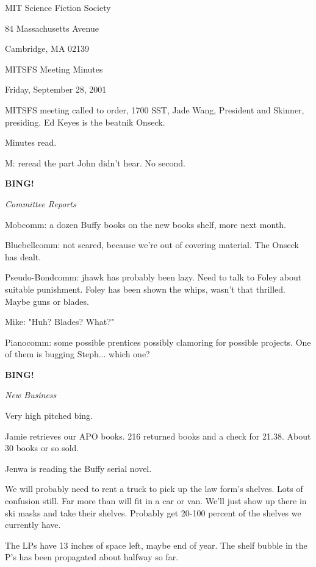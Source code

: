 \documentclass[12pt]{article}
\newcommand{\bing}{{\bf BING!} }
\newcommand{\goto}[1]{\bing \vskip 12pt \centerline{{\em{#1}}}}
\begin{document}
\begin{center}

MIT Science Fiction Society 

84 Massachusetts Avenue

Cambridge, MA 02139

\vspace{12pt}

MITSFS Meeting Minutes 

Friday, September 28, 2001

\end{center}
 
\vspace{18pt}

\setlength{\parskip}{6pt}

\noindent
MITSFS meeting called to order, 1700 SST, Jade Wang, President and
Skinner, presiding.  Ed Keyes is the beatnik Onseck.

Minutes read.

M: reread the part John didn't hear. No second.

\goto{Committee Reports}

Mobcomm: a dozen Buffy books on the new books shelf, more next month.

Bluebellcomm: not scared, because we're out of covering material. The Onseck has dealt.

Pseudo-Bondcomm: jhawk has probably been lazy. Need to talk to Foley about suitable punishment. Foley has been shown the whips, wasn't that thrilled. Maybe guns or blades.

Mike: "Huh? Blades? What?"

Pianocomm: some possible prentices possibly clamoring for possible projects. One of them is bugging Steph... which one?

\goto{New Business}

Very high pitched bing.

Jamie retrieves our APO books. 216 returned books and a check for 21.38. About 30 books or so sold.

Jenwa is reading the Buffy serial novel.

We will probably need to rent a truck to pick up the law form's shelves. Lots of confusion still. Far more than will fit in a car or van. We'll just show up there in ski masks and take their shelves. Probably get 20-100 percent of the shelves we currently have.

The LPs have 13 inches of space left, maybe end of year. The shelf bubble in the P's has been propagated about halfway so far.
\end{document}

